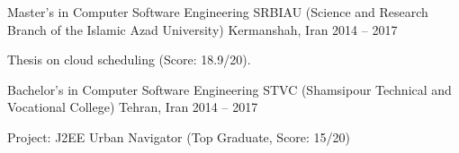 

\begin{cventries}

  \cventry
    {Master’s in Computer Software Engineering} %
    {SRBIAU (Science and Research Branch of the Islamic Azad University)} %
    {Kermanshah, Iran} %
    {2014 -- 2017} %
    {
      \begin{cvitems} %
        \item {Thesis on cloud scheduling (Score: 18.9/20).}
      \end{cvitems}
    }

    \cventry
      {Bachelor’s in Computer Software Engineering} %
      {STVC (Shamsipour Technical and Vocational College)} %
      {Tehran, Iran} %
      {2014 -- 2017} %
      {
        \begin{cvitems} %
          \item Project: J2EE Urban Navigator (Top Graduate, Score: 15/20)
        \end{cvitems}
      }

\end{cventries}
